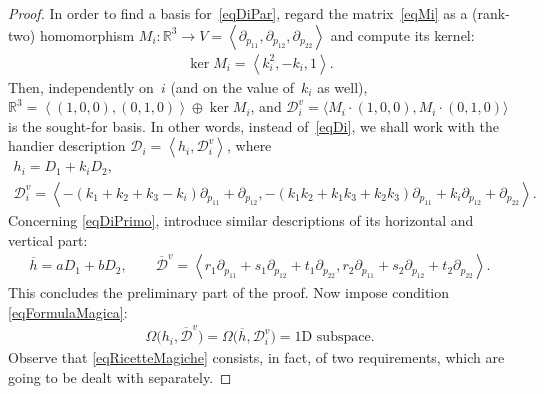 \documentclass[pdftex]{sigma}
\newcommand{\R}{\mathbb{R}}
\newcommand{\D}{\mathcal{D}}
\newcommand{\Span}[1]{\left\langle #1 \right\rangle}
\numberwithin{equation}{section}
\begin{document}
\begin{proof}
In order to f\/ind a basis for~\eqref{eqDiPar}, regard the matrix~\eqref{eqMi} as a (rank-two) homomorphism $M_i\colon \R^3\longrightarrow V=\Span{\partial_{p_{11}},\partial_{p_{12}},\partial_{p_{22}}}$ and compute its kernel:
\begin{gather*}%
\ker M_i=\Span{k_i^2,-k_i,1}.
\end{gather*}
Then, independently on~$i$ (and on the value of~$k_i$ as well),
$\R^3=\Span{(1,0,0), (0,1,0)}\oplus \ker M_i$,
and
$\D_i^v=\langle M_i\cdot (1,0,0), M_i\cdot (0,1,0)\rangle$
 is the sought-for basis. In other words, instead of~\eqref{eqDi}, we shall work with the handier description
$\D_i=\Span{h_i, \D_i^v}$,
where
\begin{gather}
h_i = D_1 + k_iD_2 ,\nonumber\\
\D_i^v = \Span{ -(k_1+k_2+k_3-k_i) \partial_{p_{11}} + \partial_{p_{12}}, -(k_1k_2+k_1k_3+k_2k_3)\partial_{p_{11}}+k_i \partial_{p_{12}}+ \partial_{p_{22}} }.\label{eqDiV}
\end{gather}
Concerning \eqref{eqDiPrimo}, introduce similar descriptions of its horizontal and vertical part:
\begin{gather}
\overline{h} = aD_1+bD_2,\qquad
\overline{\D}^v = \Span{r_1\partial_{p_{11}}+s_1 \partial_{p_{12}}+t_1 \partial_{p_{22}},r_2\partial_{p_{11}}+s_2 \partial_{p_{12}}+t_2 \partial_{p_{22}}}.\label{eqVprimo}
\end{gather}
This concludes the preliminary part of the proof. Now impose condition \eqref{eqFormulaMagica}:
\begin{gather}\label{eqRicetteMagiche}
\Omega\big(h_i,\overline{\D}^v\big)=\Omega\big(\overline{h},\D_i^v\big)=\textrm{1D subspace}.
\end{gather}
Observe that \eqref{eqRicetteMagiche} consists, in fact, of two requirements, which are going to be dealt with separately.


\end{proof}
\end{document}

